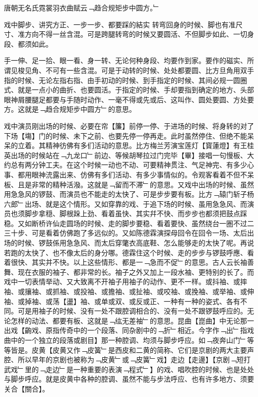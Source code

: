 \begin{preface}
唐朝无名氏霓裳羽衣曲赋云﹁趋合规矩步中圆方。﹂
\end{preface}

戏中脚步、讲究方正、一步一步、都要踩的結实 转弯回身的时候、脚也有准尺寸、准方向不得一丝含混。可是跨腿转弯的时候又要圆活、不但脚步如此、一切身段、都须如此。

手一伸、足一拾、眼一看、身一转、无论何种身段、均要作到家。要作的磁实、所谓见梭见角、不可有一些含混。可是于动转的时候、处处都要圆、比方旦角用双手指的时候、无论左指右指、由手初动的时候、到手指定的时候、其间必规一圆圈式、就是一点小的曲折、也要圆活。于指定的时候、手却要指到确定的地方、头部眼神屑腰腿足都要与手随时动作、一毫不得或先或后、这叫作、圆处要圆、方处要方。这就是﹁趋合规矩步中圆方﹂的意思。

戏中演员刚出场的时候、必要在帘【簾】前停一停、于进场的时候、将身转的对了下场【塲】门的时候、未下之前、也要先停一停再走。此时虽然停住、但绝不能呆呆的立着。其精神彷佛有多们活动的意思。比方梅兰芳演宝莲灯【寳蓮燈】有王桂英出场的时候站在﹁九龙口﹂前边、等候胡琴拉过门完毕【畢】接唱一句慢板、大约总有两分钟工夫。在这个时候一动也不动、可要精神贯注、气足神完、有多少心事、都用眼神㳘露出来、仿佛有多们活动、有多少事情似的。令观客看着不但不呆板、且是非常的精种活潑。这就是﹁留而不滞﹂的意思。又戏中出场的时候、虽然用急急风的锣鼓、而演员也不能走的太快了、可是步步要有板。比方﹁辕门斩子杨六郎﹂出场、就是这个情形。又如穿靠的戏、于追下场的时候、虽用急急风、而演员也须脚步拿穏、脚根跺上劲、看着虽快、其实幷不快、而步步也都须把鼓点踩稳。又如断桥许仙走圆场的时候、走的脚步要稳、看着要快、虽然绕台一圏不过二三十步、可是看着仿佛跑了多远似的。又如陈德霖演探母回令在回令一场、太后出场的时候、锣鼓係用急急风、而太后穿氅衣高底鞋、怎么能够走的太快了呢。再说若跑的太快了、也不像太后的身分哪。德霖住这个时候、走的步步与锣鼓呼應、看着很快、其实并不快。以上这些情形、都是一﹁急而不促﹂的意思。古人云长袖善舞、现在衣服的袖子、都非常的长。袖子之外又加上一段水袖、更特别的长了。而戏中一切表情举动、又大致离不开袖子用袖子的动作、更不一样。或抖袖、或摔袖、或攘袖、或抓袖、或投袖、或擔袖、或扯袖、或咬袖、或挽袖、或举袖、或伸袖、或掉袖、或荡【盪】袖、或单或双、或反或正、一种有一种的姿式、各有不同。可是用袖子的时候、没有一处不跟腔调相合的、没有一处不跟锣鼓呼应的。无论怎样的动法、都要有板、这就是﹁纮无差袖﹂的意思。昆曲【崑曲】中无论那一出戏【齣戏、原指传奇中的一个段落、同杂剧中的﹁折﹂相近。今字作﹁出﹂指戏曲中的一个独立的段落或剧目】那一种腔调、均须与脚步呼应。如﹁夜奔山门﹂等等皆是。皮黄【皮黄又作﹁皮簧﹂是西皮和二黄的简称、它们是京剧的两大主要声腔、所以早年的京剧也被称为﹁皮黄﹂或﹁皮簧﹂戏】走边【走邊】【京剧﹁短打武戏﹂里的﹁走边﹂是一种重要的表演﹁程式﹂】的戏、唱吹腔的时候、也是处处与脚步呼应。就是皮黄中各种的腔调、虽然不能与步法呼应、也有许多地方、须要关合【關合】。

